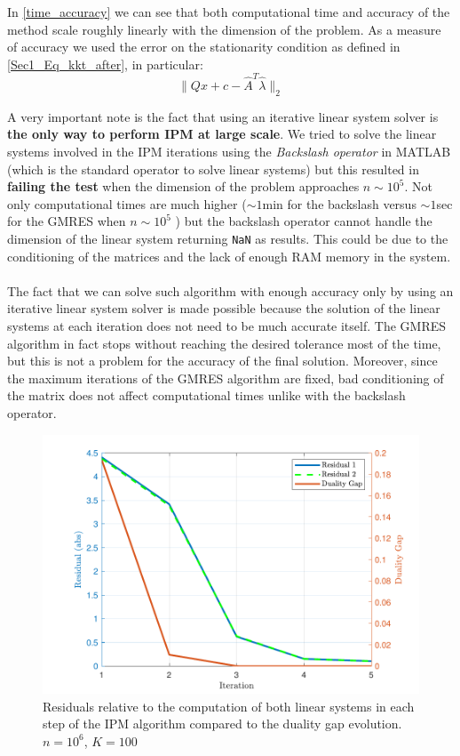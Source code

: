 \noindent In \ref{time_accuracy} we can see that both computational time and accuracy of the method scale roughly linearly with the dimension of the problem. As a measure of accuracy we used the error on the stationarity condition as defined in \ref{Sec1_Eq_kkt_after}, in particular:
\[ \| Qx + c - \hat{A}^T \hat{\lambda} \| _ 2\]

\noindent A very important note is the fact that using an iterative linear system solver is \textbf{the only way to perform IPM at large scale}. We tried to solve the linear systems involved in the IPM iterations using the \textit{Backslash operator} in MATLAB (which is the standard operator to solve linear systems) but this resulted in \textbf{failing the test} when the dimension of the problem approaches \(n \sim 10^5\). Not only computational times are much higher (\(\sim 1\)min for the backslash versus \(\sim 1\)sec for the GMRES when \(n \sim 10^5\) ) but the backslash operator cannot handle the dimension of the linear system returning \texttt{NaN} as results. This could be due to the conditioning of the matrices and the lack of enough RAM memory in the system.
\\
\\
\noindent The fact that we can solve such algorithm with enough accuracy only by using an iterative linear system solver is made possible because the solution of the linear systems at each iteration does not need to be much accurate itself. The GMRES algorithm in fact stops without reaching the desired tolerance most of the time, but this is not a problem for the accuracy of the final solution. Moreover, since the maximum iterations of the GMRES algorithm are fixed, bad conditioning of the matrix does not affect computational times unlike  with the backslash operator.

\begin{figure}[H]
	\centering
	\includegraphics[scale = 0.8]{pictures/res_vs_duality.pdf}
	\caption{Residuals relative to the computation of both linear systems in each step of the IPM algorithm compared to the duality gap evolution. \(n = 10^6\), \(K = 100\)}
	\label{res_vs_duality}
\end{figure}

